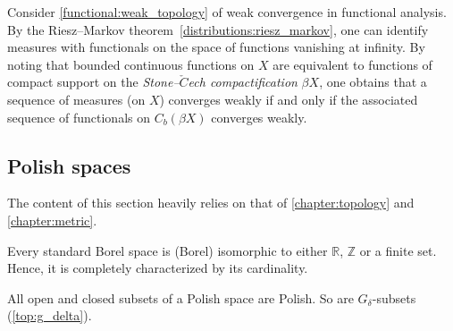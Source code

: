     \begin{remark}
        Consider \cref{functional:weak_topology} of weak convergence in functional analysis. By the Riesz--Markov theorem~\ref{distributions:riesz_markov}, one can identify measures with functionals on the space of functions vanishing at infinity. By noting that bounded continuous functions on $X$ are equivalent to functions of compact support on the \textit{Stone--$\check{C}$ech compactification} $\beta X$, one obtains that a sequence of measures (on $X$) converges weakly if and only if the associated sequence of functionals on $C_b(\beta X)$ converges weakly.
    \end{remark}

\subsection{Polish spaces}

    The content of this section heavily relies on that of \cref{chapter:topology} and \cref{chapter:metric}.


    \begin{theorem}[Kuratowski]
        Every standard Borel space is (Borel) isomorphic to either $\mathbb{R}$, $\mathbb{Z}$ or a finite set. Hence, it is completely characterized by its cardinality.
    \end{theorem}

    \begin{property}
        All open and closed subsets of a Polish space are Polish. So are $G_\delta$-subsets (\cref{top:g_delta}).
    \end{property}


